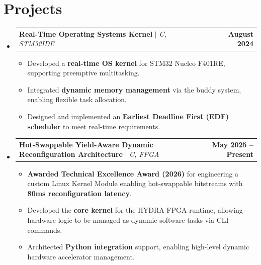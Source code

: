 \documentclass[letterpaper,12pt]{article}
\makeatletter
\newcommand{\resumeItem}[1]{
  \item\small{
    {#1 \vspace{-2pt}}
  }
}
\newcommand{\resumeProjectHeading}[2]{
    \item
    \begin{tabular*}{1.001\textwidth}{l@{\extracolsep{\fill}}r}
      \small#1 & \textbf{\small #2}\\
    \end{tabular*}\vspace{-7pt}
}
\newcommand{\resumeSubHeadingListStart}{\begin{itemize}[leftmargin=0.0in, label={}]}
\newcommand{\resumeSubHeadingListEnd}{\end{itemize}}
\newcommand{\resumeItemListStart}{\begin{itemize}[itemsep=2pt, parsep=0pt]}
\newcommand{\resumeItemListEnd}{\end{itemize}\vspace{-5pt}}
\makeatother
\begin{document}
\section{\color{blue_head}Projects}
    \vspace{-5pt}
    \resumeSubHeadingListStart
\resumeProjectHeading
    {\textbf{\color{blue_egypt}Real-Time Operating Systems Kernel} $|$ \emph{C, STM32IDE}}{August 2024}
    \resumeItemListStart
      \resumeItem{Developed a \textbf{real-time OS kernel} for STM32 Nucleo F401RE, supporting preemptive multitasking.}
      \resumeItem{Integrated \textbf{dynamic memory management} via the buddy system, enabling flexible task allocation.}
      \resumeItem{Designed and implemented an \textbf{Earliest Deadline First (EDF) scheduler} to meet real-time requirements.}
    \resumeItemListEnd
    \vspace{-14pt}
\resumeProjectHeading
    {\textbf{\color{blue_egypt}Hot-Swappable Yield-Aware Dynamic Reconfiguration Architecture} $|$ \emph{C, FPGA}}{May 2025 -- Present}
    \resumeItemListStart
      \resumeItem{\textbf{Awarded Technical Excellence Award (2026)} for engineering a custom Linux Kernel Module enabling hot-swappable bitstreams with \textbf{80ms reconfiguration latency}.}
      \resumeItem{Developed the \textbf{core kernel} for the HYDRA FPGA runtime, allowing hardware logic to be managed as dynamic software tasks via CLI commands.}
      \resumeItem{Architected \textbf{Python integration} support, enabling high-level dynamic hardware accelerator management.}
    \resumeItemListEnd
    \vspace{-13pt}
    \resumeSubHeadingListEnd
\end{document}
